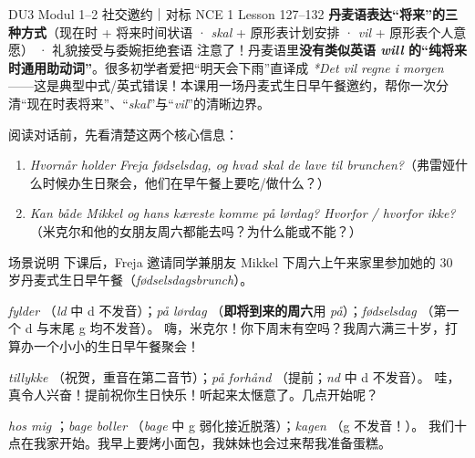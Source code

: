 {DU3 Modul 1--2 社交邀约｜对标 NCE 1 Lesson 127--132}
{\textbf{丹麦语表达“将来”的三种方式}（现在时 + 将来时间状语 · \textit{skal} + 原形表计划安排 · \textit{vil} + 原形表个人意愿） · 礼貌接受与委婉拒绝套语}
{注意了！丹麦语里\textbf{没有类似英语 \textit{will} 的“纯将来时通用助动词”}。很多初学者爱把“明天会下雨”直译成 \textit{*Det vil regne i morgen}——这是典型中式/英式错误！本课用一场丹麦式生日早午餐邀约，帮你一次分清“现在时表将来”、“\textit{skal}”与“\textit{vil}”的清晰边界。}

\begin{foerduleaeser}
阅读对话前，先看清楚这两个核心信息：
\begin{enumerate}
  \item \textit{Hvornår holder Freja fødselsdag, og hvad skal de lave til brunchen?}（弗雷娅什么时候办生日聚会，他们在早午餐上要吃/做什么？）
  \item \textit{Kan både Mikkel og hans kæreste komme på lørdag? Hvorfor / hvorfor ikke?}（米克尔和他的女朋友周六都能去吗？为什么能或不能？）
\end{enumerate}
\end{foerduleaeser}


\begin{tipbox}{场景说明}
下课后，Freja 邀请同学兼朋友 Mikkel 下周六上午来家里参加她的 30 岁丹麦式生日早午餐（\textit{fødselsdagsbrunch}）。
\end{tipbox}

{\textit{fylder} （\textit{ld} 中 d 不发音）；\textit{på lørdag} （\textbf{即将到来的周六}用 \textit{på}）；\textit{fødselsdag} （第一个 d 与末尾 g 均不发音）。}
{嗨，米克尔！你下周末有空吗？我周六满三十岁，打算办一个小小的生日早午餐聚会！}

{\textit{tillykke} （祝贺，重音在第二音节）；\textit{på forhånd} （提前；\textit{nd} 中 d 不发音）。}
{哇，真令人兴奋！提前祝你生日快乐！听起来太惬意了。几点开始呢？}

{\textit{hos mig} ；\textit{bage boller} （\textit{bage} 中 g 弱化接近脱落）；\textit{kagen} （g 不发音！）。}
{我们十点在我家开始。我早上要烤小面包，我妹妹也会过来帮我准备蛋糕。}

